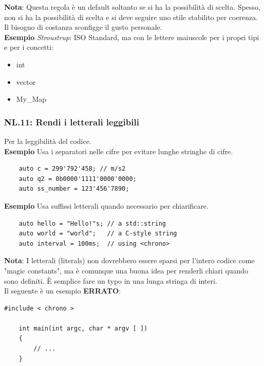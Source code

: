 \textsf{\small \textbf{Nota}: Questa regola è un default soltanto se si ha la possibilità di scelta. Spesso, non si ha la possibilità di scelta e si deve seguire uno stile stabilito per coerenza. Il bisogno di costanza sconfigge il gusto personale.} \\

\textsf{\small \textbf{Esempio} \emph{Stroustrup}: ISO Standard, ma con le lettere maiuscole per i propri tipi e per i concetti: }

\begin{itemize}
	\item \textsf{\small int}
	\item \textsf{\small vector}
	\item \textsf{\small My\_Map}
\end{itemize}

\subsubsection{NL.11: Rendi i letterali leggibili}

\textsf{\small Per la leggibilità del codice.} \\

\textsf{\small \textbf{Esempio} Usa i separatori nelle cifre per evitare lunghe stringhe di cifre.}

\begin{lstlisting}
	auto c = 299'792'458; // m/s2
	auto q2 = 0b0000'1111'0000'0000;
	auto ss_number = 123'456'7890;
\end{lstlisting}

\textsf{\small \textbf{Esempio} Usa suffissi letterali quando necessario per chiarificare.}

\begin{lstlisting}
	auto hello = "Hello!"s; // a std::string
	auto world = "world";   // a C-style string
	auto interval = 100ms;  // using <chrono>
\end{lstlisting}

\textsf{\small \textbf{Nota}: I letterali (literals) non dovrebbero essere sparsi per l'intero codice come "magic constants", ma è comunque una buona idea per renderli chiari quando sono definiti. È semplice fare un typo in una lunga stringa di interi.} \\

\textsf{\small Il seguente è un esempio \textbf{\color{red}ERRATO}\normalcolor:}

\begin{lstlisting}[frame=single, rulecolor=\color{red}]
	#include < chrono >
	
	int main(int argc, char * argv [ ])
	{
		// ...
	}
\end{lstlisting}

